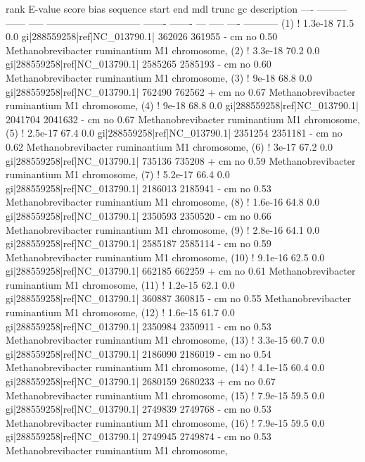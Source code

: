 \begin{sreoutput}
 rank     E-value  score  bias  sequence                        start     end   mdl trunc   gc  description
 ----   --------- ------ -----  ----------------------------- ------- -------   --- ----- ----  -----------
  (1) !   1.3e-18   71.5   0.0  gi|288559258|ref|NC_013790.1|  362026  361955 -  cm    no 0.50  Methanobrevibacter ruminantium M1 chromosome, 
  (2) !   3.3e-18   70.2   0.0  gi|288559258|ref|NC_013790.1| 2585265 2585193 -  cm    no 0.60  Methanobrevibacter ruminantium M1 chromosome, 
  (3) !     9e-18   68.8   0.0  gi|288559258|ref|NC_013790.1|  762490  762562 +  cm    no 0.67  Methanobrevibacter ruminantium M1 chromosome, 
  (4) !     9e-18   68.8   0.0  gi|288559258|ref|NC_013790.1| 2041704 2041632 -  cm    no 0.67  Methanobrevibacter ruminantium M1 chromosome, 
  (5) !   2.5e-17   67.4   0.0  gi|288559258|ref|NC_013790.1| 2351254 2351181 -  cm    no 0.62  Methanobrevibacter ruminantium M1 chromosome, 
  (6) !     3e-17   67.2   0.0  gi|288559258|ref|NC_013790.1|  735136  735208 +  cm    no 0.59  Methanobrevibacter ruminantium M1 chromosome, 
  (7) !   5.2e-17   66.4   0.0  gi|288559258|ref|NC_013790.1| 2186013 2185941 -  cm    no 0.53  Methanobrevibacter ruminantium M1 chromosome, 
  (8) !   1.6e-16   64.8   0.0  gi|288559258|ref|NC_013790.1| 2350593 2350520 -  cm    no 0.66  Methanobrevibacter ruminantium M1 chromosome, 
  (9) !   2.8e-16   64.1   0.0  gi|288559258|ref|NC_013790.1| 2585187 2585114 -  cm    no 0.59  Methanobrevibacter ruminantium M1 chromosome, 
 (10) !   9.1e-16   62.5   0.0  gi|288559258|ref|NC_013790.1|  662185  662259 +  cm    no 0.61  Methanobrevibacter ruminantium M1 chromosome, 
 (11) !   1.2e-15   62.1   0.0  gi|288559258|ref|NC_013790.1|  360887  360815 -  cm    no 0.55  Methanobrevibacter ruminantium M1 chromosome, 
 (12) !   1.6e-15   61.7   0.0  gi|288559258|ref|NC_013790.1| 2350984 2350911 -  cm    no 0.53  Methanobrevibacter ruminantium M1 chromosome, 
 (13) !   3.3e-15   60.7   0.0  gi|288559258|ref|NC_013790.1| 2186090 2186019 -  cm    no 0.54  Methanobrevibacter ruminantium M1 chromosome, 
 (14) !   4.1e-15   60.4   0.0  gi|288559258|ref|NC_013790.1| 2680159 2680233 +  cm    no 0.67  Methanobrevibacter ruminantium M1 chromosome, 
 (15) !   7.9e-15   59.5   0.0  gi|288559258|ref|NC_013790.1| 2749839 2749768 -  cm    no 0.53  Methanobrevibacter ruminantium M1 chromosome, 
 (16) !   7.9e-15   59.5   0.0  gi|288559258|ref|NC_013790.1| 2749945 2749874 -  cm    no 0.53  Methanobrevibacter ruminantium M1 chromosome, 

\end{sreoutput}
